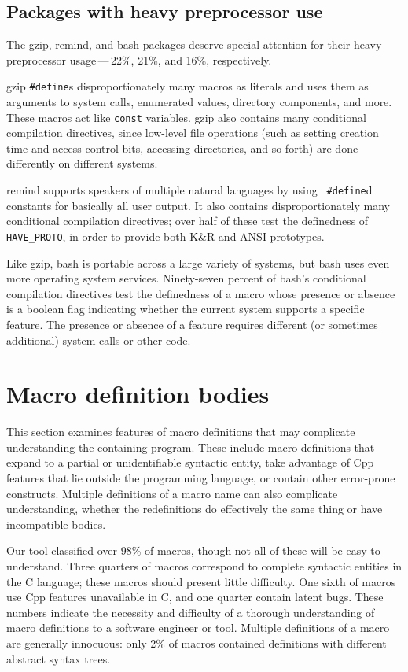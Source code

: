 \documentclass[10pt]{article}
\newcommand{\pkg}[1]{\textsf{#1}}
\begin{document}
\subsection{Packages with heavy preprocessor use}

The \pkg{gzip}, \pkg{remind}, and \pkg{bash} packages deserve
special attention for their heavy preprocessor usage\,---\,22\%, 21\%, and
16\%, respectively.

\pkg{gzip} {\tt \#define}s disproportionately many macros as literals and
uses them as arguments to system calls, enumerated values, directory
components, and more.  These macros act like {\tt const} variables.
\pkg{gzip} also contains many conditional compilation directives, since
low-level file operations (such as setting creation time and access control
bits, accessing directories, and so forth) are done differently on
different systems.

\pkg{remind} supports speakers of multiple natural languages by using {\tt
\#define}d constants for basically all user output.  It also contains
disproportionately many conditional compilation directives; over half of
these test the definedness of \verb|HAVE_PROTO|, in order to provide both
K\&R and ANSI prototypes.

Like \pkg{gzip}, \pkg{bash} is portable across a large variety of
systems, but \pkg{bash} uses even more operating system services.
Ninety-seven percent of \pkg{bash}'s conditional compilation directives
test the definedness of a macro whose presence or absence is a boolean
flag indicating whether the current system supports a specific feature.
The presence or absence of a feature requires different (or sometimes
additional) system calls or other code.


\section{Macro definition bodies}
\label{sec:categorization}

This section examines features of macro definitions that may complicate
understanding the containing program.  These include macro definitions that
expand to a partial or unidentifiable syntactic entity, take advantage of
Cpp features that lie outside the programming language, or contain other
error-prone constructs.  Multiple definitions of a macro name can also
complicate understanding, whether the redefinitions do effectively the same
thing or have incompatible bodies.

Our tool classified over 98\% of macros, though not all of these will be
easy to understand.  Three quarters of macros correspond to complete
syntactic entities in the C language; these macros should present little
difficulty.  One sixth of macros use Cpp features unavailable in C, and one
quarter contain latent bugs.  These numbers indicate the necessity and
difficulty of a thorough understanding of macro definitions to a software
engineer or tool.  Multiple definitions of a macro are generally innocuous:
only 2\% of macros contained definitions with different abstract syntax
trees.
\end{document}
